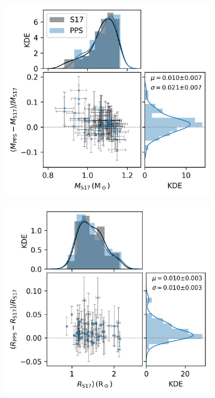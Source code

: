 \documentclass[fleqn,usenatbib]{mnras}
\begin{document}
\begin{figure}
    \centering
    \begin{subfigure}[b]{.33\linewidth}
        \includegraphics[width=\linewidth]{figures/mass_comp.png}
    \end{subfigure}%
    \begin{subfigure}[b]{.33\linewidth}
        \includegraphics[width=\linewidth]{figures/rad_comp.png}

\end{subfigure}
\end{figure}
\end{document}
